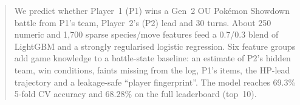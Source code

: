 \begin{abstract}
We predict whether Player~1 (P1) wins a Gen~2 OU Pok\'emon Showdown battle from P1's team, Player~2's (P2) lead and 30 turns.
About 250 numeric and 1{,}700 sparse species/move features feed a 0.7/0.3 blend of LightGBM and a strongly regularised logistic regression.
Six feature groups add game knowledge to a battle-state baseline: an estimate of P2's hidden team, win conditions, faints missing from the log, P1's items, the HP-lead trajectory and a leakage-safe ``player fingerprint''.
The model reaches 69.3\% 5-fold CV accuracy and 68.28\% on the full leaderboard (top~10).
\end{abstract}
